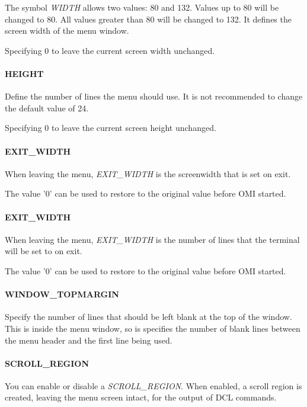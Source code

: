 \documentclass[a4paper]{book}
\begin{document}
The symbol \textsl{WIDTH} allows two values: 80 and 132. Values up to 80 will be 
changed to 80. All values greater than 80 will be changed to 132. It defines 
the screen width of the menu window.

Specifying 0 to leave the current screen width unchanged.

\paragraph{HEIGHT}

Define the number of lines the menu should use. It is not recommended to 
change the default value of 24.

Specifying 0 to leave the current screen height unchanged.


\paragraph{EXIT{\_}WIDTH}

When leaving the menu, \textsl{EXIT{\_}WIDTH} is the screenwidth that is set on 
exit.

The value '0' can be used to restore to the original value before OMI started.

\paragraph{EXIT{\_}WIDTH}

When leaving the menu, \textsl{EXIT{\_}WIDTH} is the number of lines that the terminal will be set to on exit.

The value '0' can be used to restore to the original value before OMI started.

\paragraph{WINDOW{\_}TOPMARGIN}

Specify the number of lines that should be left blank at the top of the 
window. This is inside the menu window, so is specifies the number of blank 
lines between the menu header and the first line being used.

\paragraph{SCROLL{\_}REGION}

You can enable or disable a \textsl{SCROLL{\_}REGION}. When enabled, a scroll region 
is created, leaving the menu screen intact, for the output of DCL commands.
\end{document}
